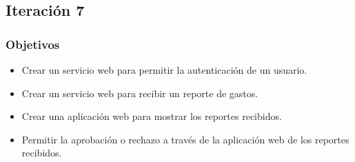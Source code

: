 \subsection{Iteración 7}
\subsubsection{Objetivos}
\begin{itemize}
\item Crear un servicio web para permitir la autenticación de un usuario.
\item Crear un servicio web para recibir un reporte de gastos.
\item Crear una aplicación web para mostrar los reportes recibidos.
\item Permitir la aprobación o rechazo a través de la aplicación web de los reportes recibidos.
\end{itemize}
